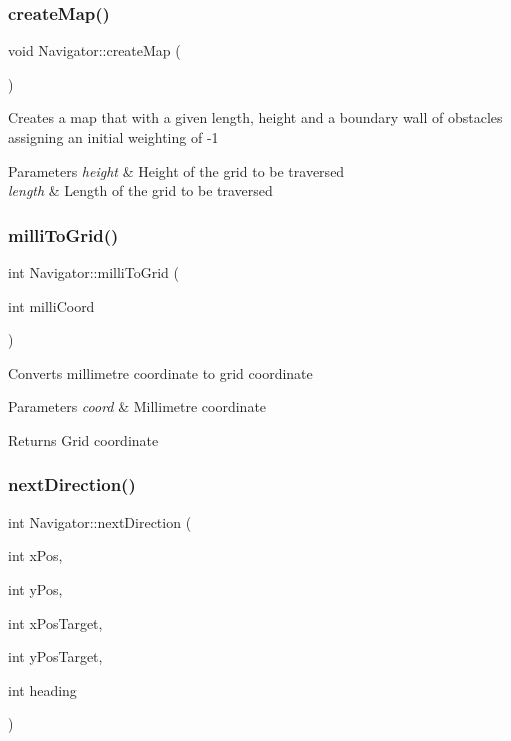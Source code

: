 \subsubsection{\texorpdfstring{create\+Map()}{createMap()}}
{\footnotesize\ttfamily void Navigator\+::create\+Map (\begin{DoxyParamCaption}{ }\end{DoxyParamCaption})\hspace{0.3cm}{\ttfamily [private]}}

Creates a map that with a given length, height and a boundary wall of obstacles assigning an initial weighting of -\/1


\begin{DoxyParams}{Parameters}
{\em height} & Height of the grid to be traversed \\
\hline
{\em length} & Length of the grid to be traversed \\
\hline
\end{DoxyParams}
\mbox{\label{class_navigator_a2e9d96fbec09518d6ef692457381213f}} 
\subsubsection{\texorpdfstring{milli\+To\+Grid()}{milliToGrid()}}
{\footnotesize\ttfamily int Navigator\+::milli\+To\+Grid (\begin{DoxyParamCaption}\item[{int}]{milli\+Coord }\end{DoxyParamCaption})}

Converts millimetre coordinate to grid coordinate


\begin{DoxyParams}{Parameters}
{\em coord} & Millimetre coordinate ~\newline
 \\
\hline
\end{DoxyParams}
\begin{DoxyReturn}{Returns}
Grid coordinate 
\end{DoxyReturn}
\mbox{\label{class_navigator_afd635da3acecec77272cbbeccfc29b35}} 
\subsubsection{\texorpdfstring{next\+Direction()}{nextDirection()}}
{\footnotesize\ttfamily int Navigator\+::next\+Direction (\begin{DoxyParamCaption}\item[{int}]{x\+Pos,  }\item[{int}]{y\+Pos,  }\item[{int}]{x\+Pos\+Target,  }\item[{int}]{y\+Pos\+Target,  }\item[{int}]{heading }\end{DoxyParamCaption})}

